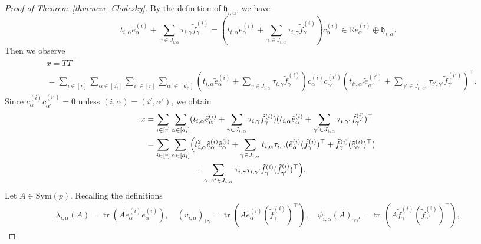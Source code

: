 \documentclass[12pt]{amsart}
\theoremstyle{plain}
\theoremstyle{definition}
\theoremstyle{remark}
\newcommand{\R}{\mathbb{R}}
\newcommand{\1}{\mathbf{1}}
\newcommand{\tr}{\operatorname{tr}}
\newcommand{\mytransp}[1]{ #1^{\top}}
\begin{document}
\begin{proof}[Proof of Theorem~\ref{thm:new_Cholesky}]
By the definition of $\mathfrak{h}_{i,\alpha}$, 
 we have
 $$
  t_{i,\alpha}  \tilde{e}^{(i)}_\alpha
  + \sum_{\gamma\in J_{i,\alpha}} \tau_{i,\gamma} \tilde{f}^{(i)}_\gamma 
  =
  (t_{i,\alpha}  \tilde{e}^{(i)}_\alpha
   + \sum_{\gamma\in J_{i,\alpha}} \tau_{i,\gamma} \tilde{f}^{(i)}_\gamma) c^{(i)}_\alpha
  \in \R\tilde{e}^{(i)}_\alpha \oplus \mathfrak{h}_{i,\alpha}.
  $$
Then we observe
\begin{align*}
{} & x = T \mytransp{T} \\
&= \sum_{i \in [r]}\sum_{\alpha \in [d_i]} \sum_{i' \in [r]} \sum_{\alpha' \in [d_{i'}]}
(t_{i,\alpha}  \tilde{e}^{(i)}_\alpha
   + \sum_{\gamma\in J_{i,\alpha}} \tau_{i,\gamma} \tilde{f}^{(i)}_\gamma ) c^{(i)}_\alpha c^{(i')}_{\alpha'} 
 \mytransp{(t_{i',\alpha'}  \tilde{e}^{(i')}_{\alpha'}
   + \sum_{\gamma' \in J_{i',\alpha'}} \tau_{i',\gamma'} \tilde{f}^{(i')}_{\gamma'} )}.   
 \end{align*}
Since $c^{(i)}_\alpha c^{(i')}_{\alpha'} =0$ unless $(i,\alpha) = (i', \alpha')$, 
 we obtain
 \begin{equation} \label{eqn:x_TT}
 \begin{aligned}
 x &= \sum_{i \in [r]}\sum_{\alpha \in [d_i]} 
 (t_{i,\alpha}  \tilde{e}^{(i)}_\alpha
 + \sum_{\gamma\in J_{i,\alpha}} \tau_{i,\gamma} \tilde{f}^{(i)}_\gamma ) 
 \mytransp{(t_{i,\alpha}  \tilde{e}^{(i)}_{\alpha}
   + \sum_{\gamma' \in J_{i,\alpha}} \tau_{i,\gamma'} \tilde{f}^{(i)}_{\gamma'} )}\\
   &= \sum_{i \in [r]}\sum_{\alpha \in [d_i]} 
 \Bigl( t_{i,\alpha}^2  \tilde{e}^{(i)}_\alpha \tilde{e}^{(i)}_\alpha
 + \sum_{\gamma\in J_{i,\alpha}} t_{i,\alpha} \tau_{i,\gamma} 
  (\tilde{e}^{(i)}_\alpha \mytransp{(\tilde{f}^{(i)}_\gamma) }
   + \tilde{f}^{(i)}_\gamma \mytransp{(\tilde{e}^{(i)}_\alpha)} )\\
 &\hphantom{={}\sum_{i \in [r]}\sum_{\alpha \in [d_i]}\Bigl(}{}+ \sum_{\gamma,\,\gamma' \in J_{i,\alpha} } 
   \tau_{i,\gamma} \tau_{i,\gamma'}  \tilde{f}^{(i)}_\gamma \mytransp{ (\tilde{f}^{(i)}_{\gamma'}) } \Bigr).
 \end{aligned}
 \end{equation}
Let $A \in \mathrm{Sym}(p)$.
Recalling the definitions 
\begin{align*}
\lambda_{i,\alpha}(A)
 = \tr(A \tilde{e}^{(i)}_{\alpha} \tilde{e}^{(i)}_{\alpha}),\quad 
(v_{i,\alpha})_{1\gamma}
 = \tr (A \tilde{e}^{(i)}_{\alpha}  \mytransp{(\tilde{f}^{(i)}_\gamma)} ), \quad 
\psi_{i,\alpha}(A)_{\gamma \gamma'}
 = \tr\, (A\tilde{f}^{(i)}_{\gamma} \mytransp{ (\tilde{f}^{(i)}_{\gamma'}) }),

\end{align*}
\end{proof}
\end{document}
